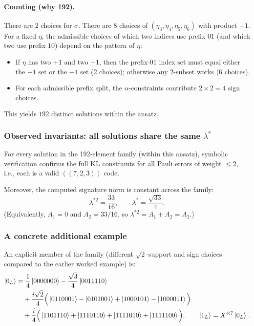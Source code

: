 \documentclass[11pt]{article}
\begin{document}
\paragraph{Counting (why 192).}
There are \(2\) choices for \(\sigma\). There are \(8\) choices of \((\eta_3,\eta_4,\eta_5,\eta_6)\) with product \(+1\).
For a fixed \(\eta\), the admissible choices of which two indices use prefix \(01\) (and which two use prefix \(10\)) depend on the pattern of \(\eta\):
\begin{itemize}
\item If \(\eta\) has two \(+1\) and two \(-1\), then the prefix-\(01\) index set must equal either the \(+1\) set or the \(-1\) set (2 choices); otherwise any 2-subset works (6 choices).
\item For each admissible prefix split, the \(\alpha\)-constraints contribute \(2\times 2=4\) sign choices.
\end{itemize}
This yields \(192\) distinct solutions within the ansatz.

\subsubsection{Observed invariants: all solutions share the same \texorpdfstring{$\lambda^\ast$}{lambda*}}

For every solution in the 192-element family (within this ansatz), symbolic verification confirms the full KL constraints for all Pauli errors of weight \(\le 2\), i.e., each is a valid \(((7,2,3))\) code.

Moreover, the computed signature norm is constant across the family:
\[
\boxed{\lambda^{\ast 2}=\frac{33}{16},\qquad \lambda^\ast=\frac{\sqrt{33}}{4}.}
\]
(Equivalently, \(A_1=0\) and \(A_2=33/16\), so \(\lambda^{\ast 2}=A_1+A_2=A_2\).)

\subsubsection{A concrete additional example}

An explicit member of the family (different \(\sqrt2\)-support and sign choices compared to the earlier worked example) is:
\[
\begin{aligned}
\ket{0_L}
=&\ \frac{1}{4}\ket{0000000}
-\frac{\sqrt3}{4}\ket{0011110}\\
&+\frac{i\sqrt2}{4}\Big(
\ket{0110001}-\ket{0101001}+\ket{1000101}-\ket{1000011}
\Big)\\
&+\frac{i}{4}\Big(
\ket{1101110}+\ket{1110110}+\ket{1111010}+\ket{1111100}
\Big),
\qquad \ket{1_L}=X^{\otimes 7}\ket{0_L}.
\end{aligned}
\]
\end{document}
